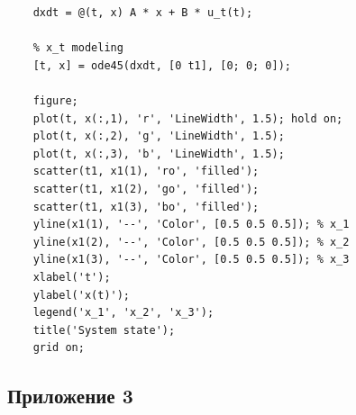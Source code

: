 \documentclass[a4paper, 12pt]{article}
\begin{document}
\begin{lstlisting}[label=task2, caption={Программа для второго задания}]
    % x_t
    dxdt = @(t, x) A * x + B * u_t(t);

    % x_t modeling
    [t, x] = ode45(dxdt, [0 t1], [0; 0; 0]);

    figure;
    plot(t, x(:,1), 'r', 'LineWidth', 1.5); hold on;
    plot(t, x(:,2), 'g', 'LineWidth', 1.5);
    plot(t, x(:,3), 'b', 'LineWidth', 1.5);
    scatter(t1, x1(1), 'ro', 'filled');
    scatter(t1, x1(2), 'go', 'filled');
    scatter(t1, x1(3), 'bo', 'filled');
    yline(x1(1), '--', 'Color', [0.5 0.5 0.5]); % x_1
    yline(x1(2), '--', 'Color', [0.5 0.5 0.5]); % x_2
    yline(x1(3), '--', 'Color', [0.5 0.5 0.5]); % x_3
    xlabel('t');
    ylabel('x(t)');
    legend('x_1', 'x_2', 'x_3');
    title('System state');
    grid on;
    \end{lstlisting}


    \subsection{Приложение 3}
\end{document}
